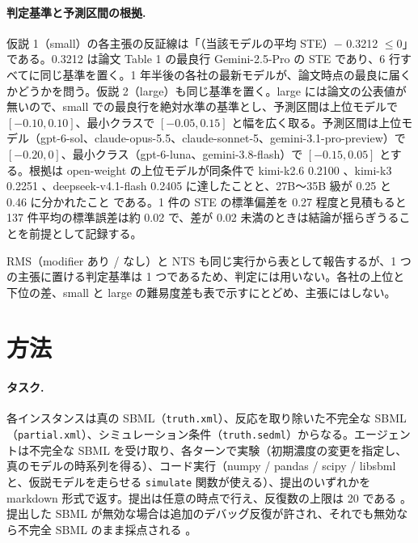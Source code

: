 \documentclass{article}
\providecommand{\unverified}[1]{#1}
\begin{document}


\paragraph{判定基準と予測区間の根拠.}
仮説 1（small）の各主張の反証線は「（当該モデルの平均 STE）$-$ \unverified{0.3212} $\le 0$」である。\unverified{0.3212} は論文 Table 1 の最良行 Gemini-2.5-Pro の STE \cite[s1.p5]{duan-2025-measuring} であり、6 行すべてに同じ基準を置く。1 年半後の各社の最新モデルが、論文時点の最良に届くかどうかを問う。仮説 2（large）も同じ基準を置く。large には論文の公表値が無いので、small での最良行を絶対水準の基準とし、予測区間は上位モデルで $[-0.10, 0.10]$、最小クラスで $[-0.05, 0.15]$ と幅を広く取る。予測区間は上位モデル（gpt-6-sol、claude-opus-5.5、claude-sonnet-5、gemini-3.1-pro-preview）で $[-0.20, 0]$、最小クラス（gpt-6-luna、gemini-3.8-flash）で $[-0.15, 0.05]$ とする。根拠は open-weight の上位モデルが同条件で kimi-k2.6 \unverified{0.2100} \cite[s4.p2]{scigymrikyuopenmodels-2026-scigym}、kimi-k3 \unverified{0.2251} \cite[s4.p3]{scigymrikyuopenmodels-2026-scigym}、deepseek-v4.1-flash \unverified{0.2405} \cite[s4.p4]{scigymrikyuopenmodels-2026-scigym} に達したことと、27B〜35B 級が 0.25 と 0.46 に分かれたこと \cite[s4.p5, s4.p6]{scigymrikyuopenmodels-2026-scigym} である。1 件の STE の標準偏差を 0.27 程度と見積もると 137 件平均の標準誤差は約 0.02 で、差が 0.02 未満のときは結論が揺らぎうることを前提として記録する。

RMS（modifier あり / なし）と NTS も同じ実行から表として報告するが、1 つの主張に置ける判定基準は 1 つであるため、判定には用いない。各社の上位と下位の差、small と large の難易度差も表で示すにとどめ、主張にはしない。

\section{方法}
\label{sec:method}
\paragraph{タスク.}
各インスタンスは真の SBML（\texttt{truth.xml}）、反応を取り除いた不完全な SBML（\texttt{partial.xml}）、シミュレーション条件（\texttt{truth.sedml}）からなる。エージェントは不完全な SBML を受け取り、各ターンで実験（初期濃度の変更を指定し、真のモデルの時系列を得る）、コード実行（numpy / pandas / scipy / libsbml と、仮説モデルを走らせる \texttt{simulate} 関数が使える）、提出のいずれかを markdown 形式で返す。提出は任意の時点で行え、反復数の上限は 20 である \cite[s1.p3]{duan-2025-measuring}。提出した SBML が無効な場合は追加のデバッグ反復が許され、それでも無効なら不完全 SBML のまま採点される \cite[s1.p4]{duan-2025-measuring}。
\end{document}

